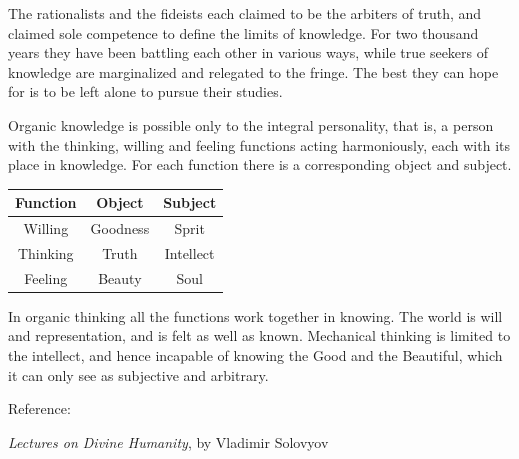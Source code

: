 The rationalists and the fideists each claimed to be the arbiters of truth, and claimed sole competence to define the limits of knowledge. For two thousand years they have been battling each other in various ways, while true seekers of knowledge are marginalized and relegated to the fringe. The best they can hope for is to be left alone to pursue their studies.

Organic knowledge is possible only to the integral personality, that is, a person with the thinking, willing and feeling functions acting harmoniously, each with its place in knowledge. For each function there is a corresponding object and subject.

\begin{table}[h]\centering\small
\begin{tabular}{ccc}\toprule
\textbf{Function} & \textbf{Object} & \textbf{Subject} \\\midrule
Willing & Goodness & Sprit \\ Thinking & Truth & Intellect \\ Feeling & Beauty & Soul \\\bottomrule
\end{tabular}
\end{table}

In organic thinking all the functions work together in knowing. The world is will and representation, and is felt as well as known. Mechanical thinking is limited to the intellect, and hence incapable of knowing the Good and the Beautiful, which it can only see as subjective and arbitrary.

Reference:

\emph{Lectures on Divine Humanity}, by Vladimir Solovyov




